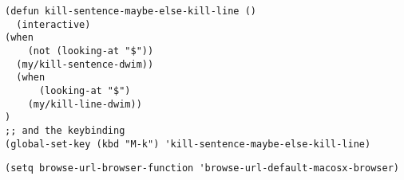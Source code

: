 \documentclass[11pt]{article}
\begin{document}
\label{sec:orge77053e}


\begin{verbatim}
(defun kill-sentence-maybe-else-kill-line ()
  (interactive)
(when
    (not (looking-at "$"))
  (my/kill-sentence-dwim))
  (when
      (looking-at "$")
    (my/kill-line-dwim))
)
;; and the keybinding
(global-set-key (kbd "M-k") 'kill-sentence-maybe-else-kill-line)

\end{verbatim}

\label{sec:org0f1d3b7}

\begin{verbatim}
(setq browse-url-browser-function 'browse-url-default-macosx-browser)
\end{verbatim}
\label{sec:org3a763a4}
\end{document}
